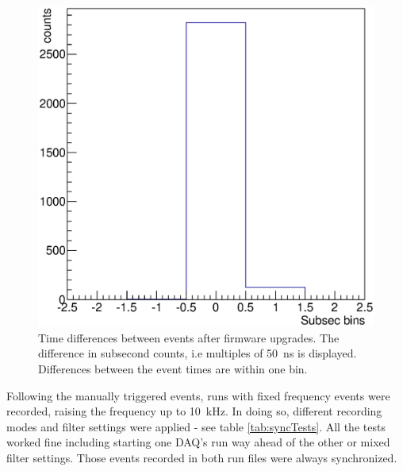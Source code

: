   \begin{figure}
  \centering
  \includegraphics[width = 0.9 \textwidth]{graphics/sync/sync.eps}
	\caption[DAQ Synchronisation]{Time differences between events after firmware upgrades. The difference in subsecond counts, i.e multiples of \SI{50}{\nano\second} is displayed. Differences between the event times are within one bin.}
  \end{figure}
  Following the manually triggered events, runs with fixed frequency events were recorded, raising the frequency up to \SI{10}{\kilo\hertz}. In doing so, different recording modes and filter settings were applied - see table \ref{tab:syncTests}. All the tests worked fine including starting one DAQ's run way ahead of the other or mixed filter settings. Those events recorded in both run files were always synchronized.
